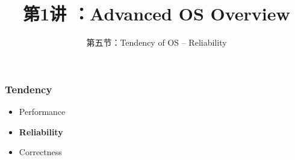 


\title[第1讲]{第1讲 ：Advanced OS Overview} %
\subtitle{第五节：Tendency of OS -- Reliability}
\date{}



\begin{frame}
\titlepage %
\end{frame}

%
%
\begin{frame}[plain]
	\frametitle{Tendency}

	\begin{itemize}\huge
	\item Performance
	\item \textbf{Reliability}
	\item Correctness
	
\end{itemize}
\end{frame}


